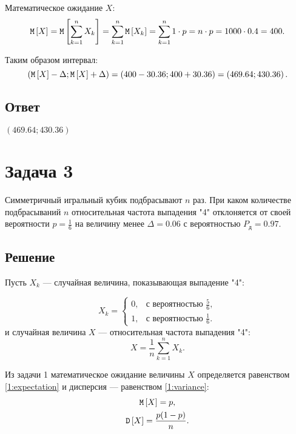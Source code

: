 Математическое ожидание $X$:
\begin{equation}
    \mathtt{M} \left [ X \right ] = \mathtt{M} \left [ \sum_{k=1}^n X_k \right ] = \sum_{k=1}^n \mathtt{M} \left [ X_k \right ] = \sum_{k=1}^n 1 \cdot p = n \cdot p = 1000 \cdot 0.4 = 400 .
\end{equation}

Таким образом интервал:
\begin{equation}
    \left ( \mathtt{M} \left [ X \right ] - \Delta ; \mathtt{M} \left [ X \right ] + \Delta \right )
    = \left ( 400 - 30.36 ; 400 + 30.36 \right )
    = \left ( 469.64 ; 430.36 \right ) .
\end{equation}
\subsection*{Ответ}
$\left ( 469.64 ; 430.36 \right )$

\section*{Задача 3}

Симметричный игральный кубик подбрасывают $n$ раз. При каком количестве подбрасываний $n$ относительная частота выпадения "4"{} отклоняется от своей вероятности
$p = \frac{1}{6}$ на величину менее $\Delta = 0.06$ с вероятностью $P_\text{д} = 0.97$.

\subsection*{Решение}
Пусть $X_k$ --- случайная величина, показывающая выпадение "4":

\begin{equation}
    X_k =
    \left \{
    \begin{array}{ll}
        0, & \text{с вероятностью } \frac{5}{6},  \\
        1, & \text{с вероятностью } \frac{1}{6} .
    \end{array}
    \right .
\end{equation}
и случайная величина $X$ --- относительная частота выпадения "4":
\begin{equation}
    X = \frac{1}{n} \sum_{k=1}^n X_k .
\end{equation}

Из задачи 1 математическое ожидание величины $X$ определяется равенством \eqref{1:expectation} и дисперсия --- равенством \eqref{1:variance}:
\begin{gather}
    \mathtt{M} \left [ X \right ] = p, \\
    \mathtt{D} \left [ X \right ] = \frac{p ( 1 - p )}{n} .
\end{gather}

